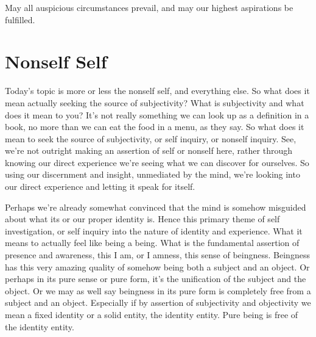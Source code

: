 \documentclass[12pt,openany]{book}
\begin{document}
May all auspicious circumstances prevail, and may our highest aspirations be fulfilled.

\begin{figure}[h]
    \centering
\end{figure}

\chapter*{Nonself Self}

Today's topic is more or less the nonself self, and everything else. So what does it mean actually seeking the source of subjectivity? What is subjectivity and what does it mean to you? It's not really something we can look up as a definition in a book, no more than we can eat the food in a menu, as they say. So what does it mean to seek the source of subjectivity, or self inquiry, or nonself inquiry. See, we're not outright making an assertion of self or nonself here, rather through knowing our direct experience we're seeing what we can discover for ourselves. So using our discernment and insight, unmediated by the mind, we're looking into our direct experience and letting it speak for itself.

Perhaps we're already somewhat convinced that the mind is somehow misguided about what its or our proper identity is. \linebreak Hence this primary theme of self investigation, or self inquiry into the nature of identity and experience. What it means to actually feel like being a being. What is the fundamental assertion of presence and awareness, this I am, or I amness, this sense of beingness. Beingness has this very amazing quality of somehow being both a subject and an object. Or perhaps in its pure sense or pure form, it's the unification of the subject and the object. Or we may as well say beingness in its pure form is completely free from a subject and an object. Especially if by assertion of subjectivity and objectivity we mean a fixed identity or a solid entity, the identity entity. Pure being is free of the identity entity.
\end{document}
